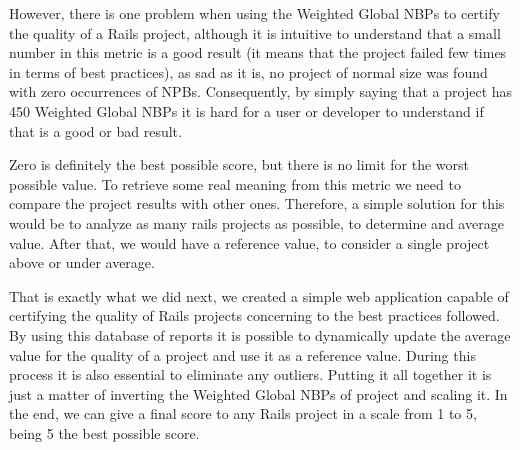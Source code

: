 However, there is one problem when using the Weighted Global NBPs to certify the quality of a Rails project, 
although it is intuitive to understand that a small number in this metric is a good result
(it means that the project failed few times in terms of best practices), as sad as it is, 
no project of normal size was found with zero occurrences of NPBs.
Consequently, by simply saying that a project has 450 Weighted Global NBPs it is hard for a user or developer
to understand if that is a good or bad result.

Zero is definitely the best possible score, but there is no limit for the worst possible value.
To retrieve some real meaning from this metric we need to compare the project results with other ones.
Therefore, a simple solution for this would be to analyze as many rails projects as possible, to determine and average value.
After that, we would have a reference value, to consider a single project above or under average.

That is exactly what we did next, 
we created a simple web application capable of certifying the quality of Rails projects concerning to the best practices followed. 
By using this database of reports it is possible to dynamically update the average value for the quality of a project 
and use it as a reference value. During this process it is also essential to eliminate any outliers. 
Putting it all together it is just a matter of inverting the Weighted Global NBPs of project and scaling it. 
In the end, we can give a final score to any Rails project in a scale from 1 to 5, being 5 the best possible score.

